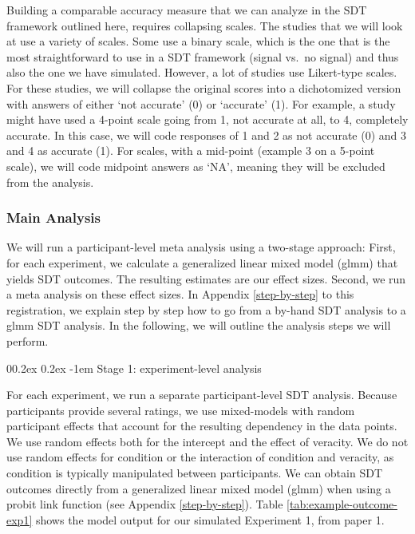 \documentclass[
  man,mask,floatsintext]{apa6}
\makeatletter
\let\oldparagraph\paragraph
\renewcommand{\paragraph}{
    \@ifstar
      \xxxParagraphStar
      \xxxParagraphNoStar
  }
\newcommand{\xxxParagraphStar}[1]{\oldparagraph*{#1}\mbox{}}
\newcommand{\xxxParagraphNoStar}[1]{\oldparagraph{#1}\mbox{}}
\renewcommand{\paragraph}{\@startsection{paragraph}{4}{\parindent}%
  {0\baselineskip \@plus 0.2ex \@minus 0.2ex}%
  {-1em}%
  {\normalfont\normalsize\bfseries\itshape\typesectitle}}
\makeatother
\begin{document}
\endgroup{}

Building a comparable accuracy measure that we can analyze in the SDT framework outlined here, requires collapsing scales. The studies that we will look at use a variety of scales. Some use a binary scale, which is the one that is the most straightforward to use in a SDT framework (signal vs.~no signal) and thus also the one we have simulated. However, a lot of studies use Likert-type scales. For these studies, we will collapse the original scores into a dichotomized version with answers of either `not accurate' (0) or `accurate' (1). For example, a study might have used a 4-point scale going from 1, not accurate at all, to 4, completely accurate. In this case, we will code responses of 1 and 2 as not accurate (0) and 3 and 4 as accurate (1). For scales, with a mid-point (example 3 on a 5-point scale), we will code midpoint answers as `NA', meaning they will be excluded from the analysis.

\subsubsection{Main Analysis}\label{main-analysis}

We will run a participant-level meta analysis using a two-stage approach: First, for each experiment, we calculate a generalized linear mixed model (glmm) that yields SDT outcomes. The resulting estimates are our effect sizes. Second, we run a meta analysis on these effect sizes. In Appendix \ref{step-by-step} to this registration, we explain step by step how to go from a by-hand SDT analysis to a glmm SDT analysis. In the following, we will outline the analysis steps we will perform.

\paragraph{Stage 1: experiment-level analysis}\label{stage-1-experiment-level-analysis}

For each experiment, we run a separate participant-level SDT analysis. Because participants provide several ratings, we use mixed-models with random participant effects that account for the resulting dependency in the data points. We use random effects both for the intercept and the effect of veracity. We do not use random effects for condition or the interaction of condition and veracity, as condition is typically manipulated between participants. We can obtain SDT outcomes directly from a generalized linear mixed model (glmm) when using a probit link function (see Appendix \ref{step-by-step}). Table \ref{tab:example-outcome-exp1} shows the model output for our simulated Experiment 1, from paper 1.
\end{document}
